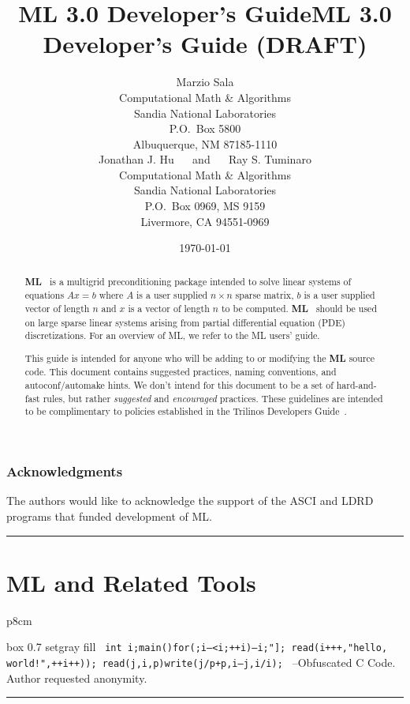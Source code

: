 \documentclass[10pt,letter,relax]{SANDreport}
\title{ML 3.0 Developer's Guide}
\title{ML 3.0 Developer's Guide (DRAFT)}
\author{
Marzio  Sala \\
Computational Math \& Algorithms \\
Sandia National Laboratories\\
P.O.~Box 5800 \\
Albuquerque, NM 87185-1110\\[20pt]
Jonathan J. Hu $\quad$ and $\quad$
Ray S. Tuminaro \\
Computational Math \& Algorithms \\
Sandia National Laboratories\\
P.O.~Box 0969, MS 9159\\
Livermore, CA 94551-0969\\
}
\date{\today}
\newcommand{\HRule}{\noindent\rule{\linewidth}{1mm}}
\newcommand{\ML}     {{\bf ML }}
\begin{document}
\maketitle

\begin{abstract}
\ML\ is a multigrid preconditioning package intended to solve linear systems
 of equations $A x = b$ where $A$ is a user supplied $n \times n$ sparse
matrix, $b$ is a user supplied vector of length $n$ and $x$ is a vector of
length $n$ to be computed. \ML\ should be used on large sparse linear
systems arising from partial differential equation (PDE) discretizations.
For an overview of ML, we refer to the ML users' guide.

This guide is intended for anyone who will be adding to or modifying the \ML
source code.  This document contains suggested practices, naming conventions,
and autoconf/automake hints.  We don't intend for this document to be a set
of hard-and-fast rules, but rather {\em suggested} and {\em encouraged}
practices. These guidelines are intended to be complimentary to policies
established in the Trilinos Developers Guide~\cite{Trilinos-Dev-Guide}.
\end{abstract}

\clearpage

\section*{Acknowledgments}
The authors would like to acknowledge the support of the ASCI and LDRD 
programs that funded development of ML.

\clearpage

\SANDmain

\tableofcontents

\clearpage
\newpage


\vspace*{3cm}
\HRule
\part{ML and Related Tools}
\bigskip

\hfill
\begin{tabular}{p{8cm}}
\begin{boxitpara}{box 0.7 setgray fill}
{\tt
        int
        i;main(){for(;i--<i;++i){--i;}"]; read(i+++,"hello,
          world!",++i++));} read(j,i,p){write(j/p+p,i---j,i/i);}
}
--Obfuscated C Code. Author requested anonymity. 
\end{boxitpara}
\end{tabular}
\HRule
\end{document}
